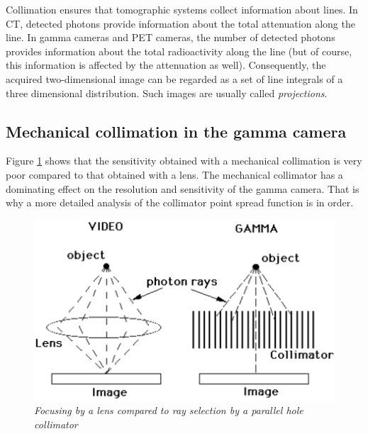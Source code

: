 Collimation ensures that tomographic systems collect information about
lines.  In CT, detected photons provide information about the total
attenuation along the line. In gamma cameras and PET cameras, the
number of detected photons provides information about the total
radioactivity along the line (but of course, this information is
affected by the attenuation as well). Consequently, the acquired
two-dimensional image can be regarded as a set of line integrals of a
three dimensional distribution. Such images are usually called {\em
projections}.

\subsection{Mechanical collimation in the gamma camera \label{sec:collimation}}
Figure \ref{fig:lenscollimator} shows that the sensitivity obtained
with a mechanical collimation is very poor compared to that obtained with a
lens. The mechanical collimator has a dominating effect on the resolution and
sensitivity of the gamma camera. That is why a more detailed analysis of the
collimator point spread function is in order.

\begin{figure}[tb]
\centering
\includegraphics[width=\figone]{figs/fig_lenscollimator.pdf}
\caption{\label{fig:lenscollimator} \emph{Focusing by a lens compared to ray
selection by a parallel hole collimator}}
\end{figure}

